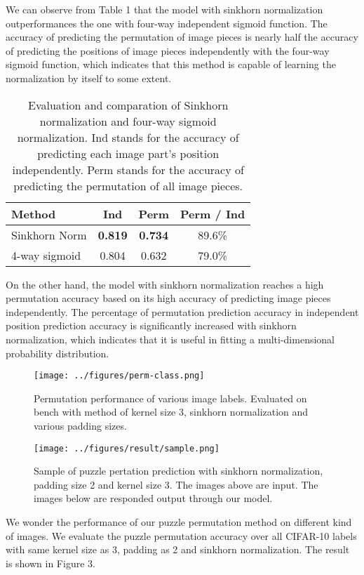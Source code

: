 \documentclass[twocolumn]{article}
\begin{document}
We can observe from Table 1 that the model with sinkhorn normalization outperformances the one with four-way 
independent sigmoid function. The accuracy of predicting the permutation of image pieces is nearly half the 
accuracy of predicting the positions of image pieces independently with the four-way sigmoid function, which 
indicates that this method is capable of learning the normalization by itself to some extent. 
\begin{table}[h]
    \centering
    \begin{tabular}{l|c|c|c}
        Method&Ind&Perm&Perm / Ind\\
        \hline
        Sinkhorn Norm&\textbf{0.819}&\textbf{0.734}&89.6\%\\
        4-way sigmoid&0.804&0.632&79.0\%\\
        \hline
    \end{tabular}
    \caption{Evaluation and comparation of Sinkhorn normalization and four-way sigmoid normalization. 
    Ind stands for the accuracy of predicting each image part's position independently. Perm stands for 
    the accuracy of predicting the permutation of all image pieces.}
\end{table}

On the other hand, the model with sinkhorn normalization reaches a high permutation accuracy based on its 
high accuracy of predicting image pieces independently. The percentage of permutation prediction accuracy in 
independent position prediction accuracy is significantly increased with sinkhorn normalization, which 
indicates that it is useful in fitting a multi-dimensional probability distribution. 
\begin{figure}[h]
    \centering
    \texttt{[image: ../figures/perm-class.png]}
    \caption{Permutation performance of various image labels. Evaluated on bench with method of kernel size 3,  
    sinkhorn normalization and various padding sizes.}
\end{figure}
\begin{figure*}[t]
    \centering
    \texttt{[image: ../figures/result/sample.png]}
    \caption{Sample of puzzle pertation prediction with sinkhorn normalization, padding size 2 and kernel size 
    3. The images above are input. The images below are responded output through our model.}
\end{figure*}

We wonder the performance of our puzzle permutation method on different kind of images. We evaluate the 
puzzle permutation accuracy over all CIFAR-10 labels with same kernel size as 3, padding as 2 and sinkhorn 
normalization. The result is shown in Figure 3. 
\end{document}
